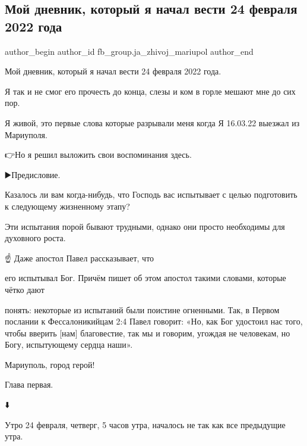  
 
 
 
 
 
\subsection{Мой дневник, который я начал вести 24 февраля 2022 года}
\label{sec:24_02_2023.fb.fb_group.ja_zhivoj_mariupol.1.dnevnik}
 
\ifcmt
 author_begin
   author_id fb_group.ja_zhivoj_mariupol
 author_end
\fi

Мой дневник, который я начал вести 24 февраля 2022 года.

Я так и не смог его прочесть до конца, слезы и ком в горле мешают мне до сих
пор.

Я живой, это первые слова которые разрывали меня когда Я 16.03.22 выезжал из
Мариуполя.

👉Но я решил выложить свои воспоминания здесь.

▶️Предисловие.

Казалось ли вам когда-нибудь, что Господь вас испытывает с целью подготовить 
к следующему жизненному этапу? 

Эти испытания порой бывают трудными, однако они просто необходимы для духовного роста.

☝️ Даже апостол Павел рассказывает, что 

его испытывал Бог. Причём пишет об этом апостол такими словами, которые чётко
дают 

понять: некоторые из испытаний были поистине огненными. Так, в Первом послании
к Фессалоникийцам 2:4 Павел говорит: «Но, как Бог удостоил нас того, чтобы вверить
[нам] благовестие, так мы и говорим, угождая не человекам, но Богу, испытующему сердца
наши». 

Мариуполь, город герой!

Глава первая.

⬇️

Утро 24 февраля, четверг, 5 часов утра, началось не так как все предыдущие
утра.

